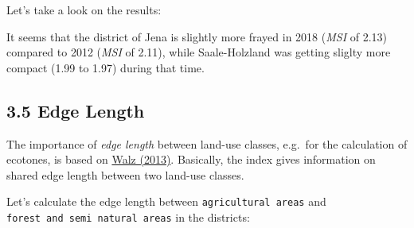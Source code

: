 \documentclass[]{article}
\newenvironment{Shaded}{\begin{snugshade}}{\end{snugshade}}
\newcommand{\KeywordTok}[1]{\textcolor[rgb]{0.13,0.29,0.53}{\textbf{#1}}}
\newcommand{\DataTypeTok}[1]{\textcolor[rgb]{0.13,0.29,0.53}{#1}}
\newcommand{\DecValTok}[1]{\textcolor[rgb]{0.00,0.00,0.81}{#1}}
\newcommand{\StringTok}[1]{\textcolor[rgb]{0.31,0.60,0.02}{#1}}
\newcommand{\CommentTok}[1]{\textcolor[rgb]{0.56,0.35,0.01}{\textit{#1}}}
\newcommand{\OtherTok}[1]{\textcolor[rgb]{0.56,0.35,0.01}{#1}}
\newcommand{\OperatorTok}[1]{\textcolor[rgb]{0.81,0.36,0.00}{\textbf{#1}}}
\newcommand{\NormalTok}[1]{#1}
\begin{document}
Let's take a look on the results:

It seems that the district of Jena is slightly more frayed in 2018
(\emph{MSI} of 2.13) compared to 2012 (\emph{MSI} of 2.11), while
Saale-Holzland was getting sliglty more compact (1.99 to 1.97) during
that time.

\subsection{3.5 Edge Length}\label{edge-length}

The importance of \emph{edge length} between land-use classes, e.g.~for
the calculation of ecotones, is based on
\href{http://rosdok.uni-rostock.de/file/rosdok_disshab_0000000980/rosdok_derivate_0000005089/Habilitationsschrift_Walz_2013.pdf}{Walz
(2013)}. Basically, the index gives information on shared edge length
between two land-use classes.

Let's calculate the edge length between \texttt{agricultural\ areas} and
\texttt{forest\ and\ semi\ natural\ areas} in the districts:

\begin{Shaded}
\end{Shaded}
\end{document}
